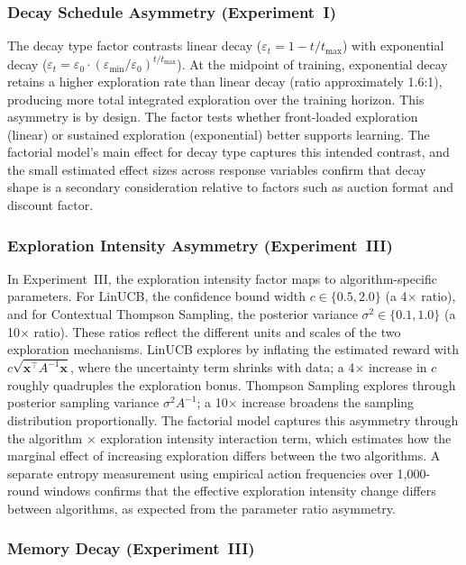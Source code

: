 \subsubsection{Decay Schedule Asymmetry (Experiment~I)}

The decay type factor contrasts linear decay ($\varepsilon_t = 1 - t/t_{\max}$) with exponential decay ($\varepsilon_t = \varepsilon_0 \cdot (\varepsilon_{\min}/\varepsilon_0)^{t/t_{\max}}$). At the midpoint of training, exponential decay retains a higher exploration rate than linear decay (ratio approximately 1.6:1), producing more total integrated exploration over the training horizon. This asymmetry is by design. The factor tests whether front-loaded exploration (linear) or sustained exploration (exponential) better supports learning. The factorial model's main effect for decay type captures this intended contrast, and the small estimated effect sizes across response variables confirm that decay shape is a secondary consideration relative to factors such as auction format and discount factor.

\subsubsection{Exploration Intensity Asymmetry (Experiment~III)}

In Experiment~III, the exploration intensity factor maps to algorithm-specific parameters. For LinUCB, the confidence bound width $c \in \{0.5, 2.0\}$ (a 4$\times$ ratio), and for Contextual Thompson Sampling, the posterior variance $\sigma^2 \in \{0.1, 1.0\}$ (a 10$\times$ ratio). These ratios reflect the different units and scales of the two exploration mechanisms. LinUCB explores by inflating the estimated reward with $c\sqrt{\mathbf{x}^\top A^{-1}\mathbf{x}}$, where the uncertainty term shrinks with data; a 4$\times$ increase in $c$ roughly quadruples the exploration bonus. Thompson Sampling explores through posterior sampling variance $\sigma^2 A^{-1}$; a 10$\times$ increase broadens the sampling distribution proportionally. The factorial model captures this asymmetry through the algorithm $\times$ exploration intensity interaction term, which estimates how the marginal effect of increasing exploration differs between the two algorithms. A separate entropy measurement using empirical action frequencies over 1{,}000-round windows confirms that the effective exploration intensity change differs between algorithms, as expected from the parameter ratio asymmetry.

\subsubsection{Memory Decay (Experiment~III)}

